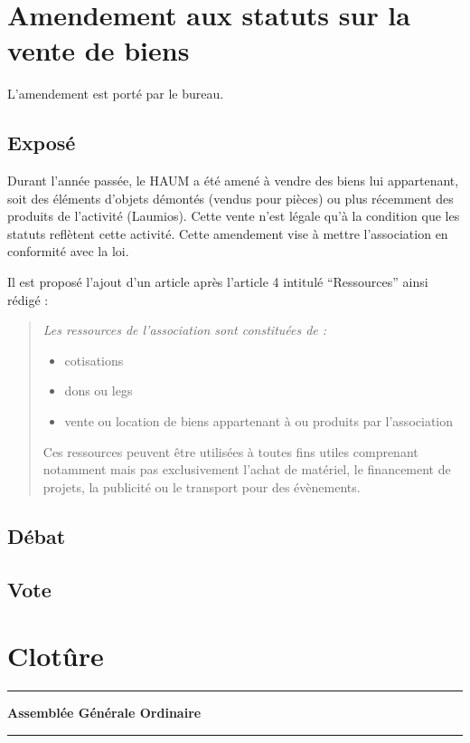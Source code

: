\documentclass[11pt]{article}
\begin{document}
\section{Amendement aux statuts sur la vente de biens}

L'amendement est porté par le bureau.

\subsection{Exposé}

Durant l'année passée, le HAUM a été amené à vendre des biens lui appartenant, soit des éléments d'objets démontés (vendus pour pièces) ou plus récemment des produits de l'activité (Laumios). Cette vente n'est légale qu'à la condition que les statuts reflètent cette activité. Cette amendement vise à mettre l'association en conformité avec la loi.

Il est proposé l'ajout d'un article après l'article 4 intitulé ``Ressources'' ainsi rédigé :

\begin{quotation}
\itshape
\noindent Les ressources de l'association sont constituées de :
\begin{itemize}
    \item cotisations 
    \item dons ou legs
    \item vente ou location de biens appartenant à ou produits par l'association
\end{itemize}
Ces ressources peuvent être utilisées à toutes fins utiles comprenant notamment mais pas exclusivement l'achat de matériel, le financement de projets, la publicité ou le transport pour des évènements.
\end{quotation}

\subsection{Débat}
\subsection{Vote}

\section*{Clotûre}

\vspace{1.5cm}

\hrule
\vspace{.6cm}
\begin{center}
\Large\bfseries Assemblée Générale Ordinaire
\end{center}
\vspace{.3cm}
\hrule
\end{document}
